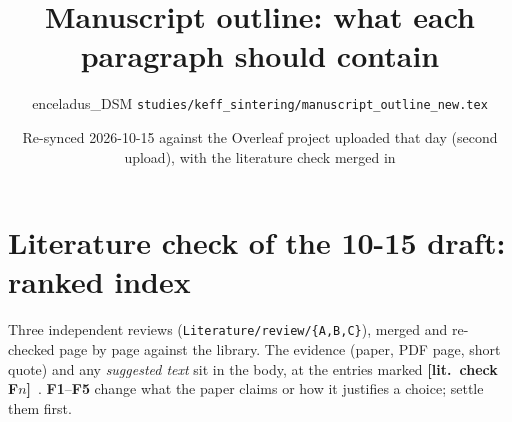 \documentclass[11pt]{article}
\title{Manuscript outline: what each paragraph should contain}
\author{enceladus\_DSM \quad \texttt{studies/keff\_sintering/manuscript\_outline\_new.tex}}
\date{Re-synced 2026-10-15 against the Overleaf project uploaded that day (second upload), with the literature check merged in}
\newcommand{\add}[1]{\textcolor{chk}{#1}}
\newcommand{\Chk}[1]{\textcolor{chk}{\textbf{[lit.\ check #1]}}\ }
\begin{document}
\maketitle

\section*{\add{Literature check of the 10-15 draft: ranked index}}
\add{Three independent reviews (\texttt{Literature/review/\{A,B,C\}}), merged
and re-checked page by page against the library. The evidence (paper, PDF
page, short quote) and any \emph{suggested text} sit in the body, at the
entries marked \Chk{F$n$}. \textbf{F1}--\textbf{F5} change what the paper
claims or how it justifies a choice; settle them first.}
\end{document}
